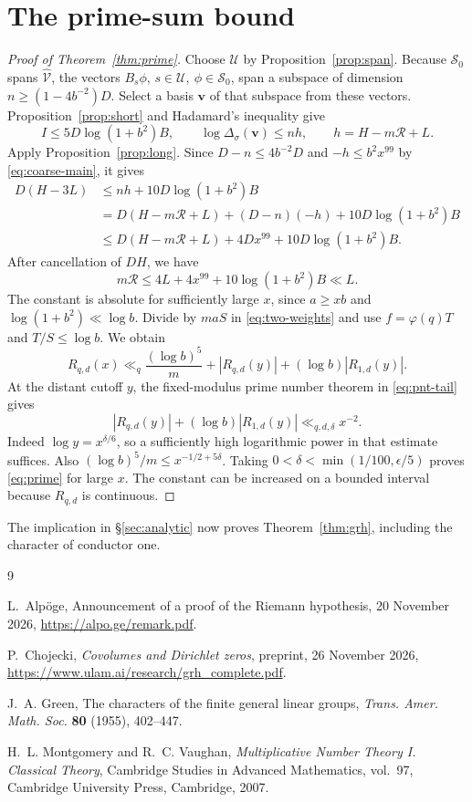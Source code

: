 \documentclass[11pt,reqno]{amsart}
\theoremstyle{definition}
\numberwithin{equation}{section}
\begin{document}
\section{The prime-sum bound}\label{sec:end}

\begin{proof}[Proof of Theorem~\ref{thm:prime}]
Choose \(\mathcal U\) by Proposition~\ref{prop:span}.
Because \(\mathcal S_0\) spans \(\widehat{\mathcal V}\), the
vectors \(B_s\phi\), \(s\in\mathcal U,\ \phi\in\mathcal S_0\),
span a subspace of dimension \(n\ge(1-4b^{-2})D\).
Select a basis \(\mathbf v\) of that subspace from these
vectors. Proposition~\ref{prop:short} and Hadamard's inequality
give
\[
 I\le 5D\log(1+b^2)B,\qquad
 \log\Delta_\sigma(\mathbf v)\le n h,\qquad
 h=H-m\mathcal R+L .
\]
Apply Proposition~\ref{prop:long}. Since \(D-n\le4b^{-2}D\)
and \(-h\le b^2x^{99}\) by \eqref{eq:coarse-main}, it gives
\begin{align*}
 D(H-3L)
 &\le nh+10D\log(1+b^2)B\\
 &=D(H-m\mathcal R+L)+(D-n)(-h)+10D\log(1+b^2)B\\
 &\le D(H-m\mathcal R+L)+4Dx^{99}+10D\log(1+b^2)B .
\end{align*}
After cancellation of \(DH\), we have
\[
 m\mathcal R\le 4L+4x^{99}+10\log(1+b^2)B\ll L .
\]
The constant is absolute for sufficiently large \(x\),
since \(a\ge xb\) and \(\log(1+b^2)\ll\log b\).
Divide by \(maS\) in \eqref{eq:two-weights} and use
\(f=\varphi(q)T\) and \(T/S\le\log b\). We obtain
\[
 R_{q,d}(x)\ll_q \frac{(\log b)^5}{m}
                 +|R_{q,d}(y)|+(\log b)|R_{1,d}(y)|.
\]
At the distant cutoff \(y\), the fixed-modulus prime number
theorem in \eqref{eq:pnt-tail} gives
\[
 |R_{q,d}(y)|+(\log b)|R_{1,d}(y)|\ll_{q,d,\delta}x^{-2}.
\]
Indeed \(\log y=x^{\delta/6}\), so a sufficiently high
logarithmic power in that estimate suffices. Also
\((\log b)^5/m\le x^{-1/2+5\delta}\).
Taking \(0<\delta<\min(1/100,\epsilon/5)\) proves
\eqref{eq:prime} for large \(x\).
The constant can be increased on a bounded interval
because \(R_{q,d}\) is continuous.
\end{proof}

The implication in \S\ref{sec:analytic} now proves
Theorem~\ref{thm:grh}, including the character of conductor
one.

\begin{thebibliography}{9}

L.~Alp\"oge,
Announcement of a proof of the Riemann hypothesis,
20 November 2026, \url{https://alpo.ge/remark.pdf}.

P.~Chojecki,
\emph{Covolumes and Dirichlet zeros},
preprint, 26 November 2026,
\url{https://www.ulam.ai/research/grh_complete.pdf}.

J.~A. Green,
The characters of the finite general linear groups,
\emph{Trans. Amer. Math. Soc.} \textbf{80} (1955), 402--447.

H.~L. Montgomery and R.~C. Vaughan,
\emph{Multiplicative Number Theory I. Classical Theory},
Cambridge Studies in Advanced Mathematics, vol.~97,
Cambridge University Press, Cambridge, 2007.

\end{thebibliography}
\end{document}
